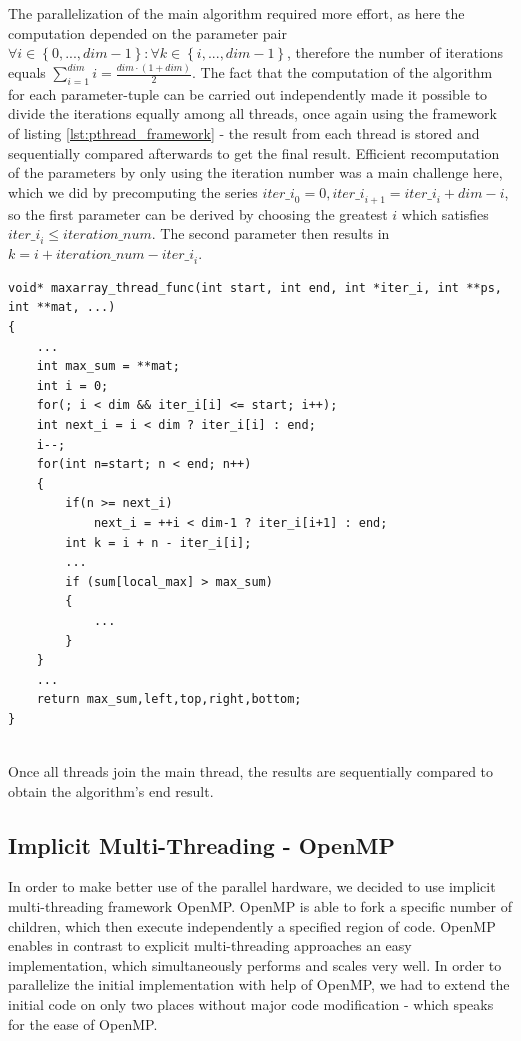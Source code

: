 \documentclass[conference]{IEEEtran}
\begin{document}
The parallelization of the main algorithm required more effort, as here the computation depended on the parameter pair $\forall i\in \left\lbrace 0,...,\mathit{dim}-1 \right\rbrace :\forall k\in \left\lbrace i,...,\mathit{dim}-1 \right\rbrace$, therefore the number of iterations equals $\sum^{\mathit{dim}}_{i=1}i=\frac{\mathit{dim}\cdot (1+\mathit{dim})}{2}$. The fact that the computation of the algorithm for each parameter-tuple can be carried out independently made it possible to divide the iterations equally among all threads, once again using the framework of listing \ref{lst:pthread_framework} - the result from each thread is stored and sequentially compared afterwards to get the final result. Efficient recomputation of the parameters by only using the iteration number was a main challenge here, which we did by precomputing the series $\mathit{iter\_i}_0=0, \mathit{iter\_i}_{i+1}=\mathit{iter\_i}_{i}+\mathit{dim}-i$, so the first parameter can be derived by choosing the greatest $i$ which satisfies $\mathit{iter\_i}_i\leq \mathit{iteration\_num}$. The second parameter then results in $k=i+\mathit{iteration\_num}-\mathit{iter\_i}_{i}$.

\begin{center}
   \begin{lstlisting}[captionpos=b, caption=pthread: Parallel Main Algorithm (simplified), label=lst:pthread_maincomp]
void* maxarray_thread_func(int start, int end, int *iter_i, int **ps, int **mat, ...)
{
	...
	int max_sum = **mat;
	int i = 0;
	for(; i < dim && iter_i[i] <= start; i++);
	int next_i = i < dim ? iter_i[i] : end;
	i--;
	for(int n=start; n < end; n++)
	{
		if(n >= next_i) 
			next_i = ++i < dim-1 ? iter_i[i+1] : end;
		int k = i + n - iter_i[i];
		...
		if (sum[local_max] > max_sum)
		{
			...
		}
	}
	...
	return max_sum,left,top,right,bottom;
}
        
   \end{lstlisting}
\end{center}

Once all threads join the main thread, the results are sequentially compared to obtain the algorithm's end result.

\subsection{Implicit Multi-Threading - OpenMP}
\label{sec:impl:openmp}

In order to make better use of the parallel hardware, we decided to use implicit multi-threading framework OpenMP. OpenMP is able to fork a specific number of children, which then execute independently a specified region of code. OpenMP enables in contrast to explicit multi-threading approaches an easy implementation, which simultaneously performs and scales very well. In order to parallelize the initial implementation with help of OpenMP, we had to extend the initial code on only two places without major code modification - which speaks for the ease of OpenMP. 
\end{document}
